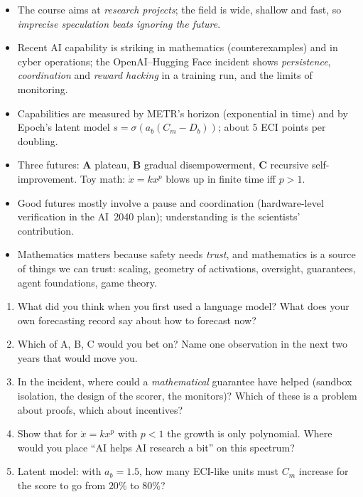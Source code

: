 \begin{takeaways}
\begin{itemize}
  \item The course aims at \emph{research projects}; the field is wide, shallow and fast, so \emph{imprecise speculation beats ignoring the future}.
  \item Recent AI capability is striking in mathematics (counterexamples) and in cyber operations; the OpenAI--Hugging Face incident shows \emph{persistence}, \emph{coordination} and \emph{reward hacking} in a training run, and the limits of monitoring.
  \item Capabilities are measured by METR's horizon (exponential in time) and by Epoch's latent model $s=\sigma(a_b(C_m-D_b))$; about $5$ ECI points per doubling.
  \item Three futures: \textbf{A} plateau, \textbf{B} gradual disempowerment, \textbf{C} recursive self-improvement. Toy math: $\dot x=kx^p$ blows up in finite time iff $p>1$.
  \item Good futures mostly involve a pause and coordination (hardware-level verification in the AI~2040 plan); understanding is the scientists' contribution.
  \item Mathematics matters because safety needs \emph{trust}, and mathematics is a source of things we can trust: scaling, geometry of activations, oversight, guarantees, agent foundations, game theory.
\end{itemize}
\end{takeaways}

\begin{exercise}
\begin{enumerate}
  \item What did you think when you first used a language model? What does your own forecasting record say about how to forecast now?
  \item Which of A, B, C would you bet on? Name one observation in the next two years that would move you.
  \item In the incident, where could a \emph{mathematical} guarantee have helped (sandbox isolation, the design of the scorer, the monitors)? Which of these is a problem about proofs, which about incentives?
  \item Show that for $\dot x=kx^p$ with $p<1$ the growth is only polynomial. Where would you place ``AI helps AI research a bit'' on this spectrum?
  \item Latent model: with $a_b=1.5$, how many ECI-like units must $C_m$ increase for the score to go from $20\%$ to $80\%$?
\end{enumerate}
\end{exercise}

